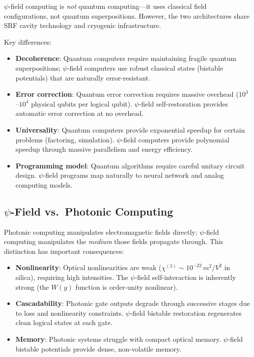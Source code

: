 \documentclass[12pt,a4paper,twoside]{article}
\begin{document}
$\psi$-field computing is \emph{not} quantum computing---it uses classical field configurations, not quantum superpositions. However, the two architectures share SRF cavity technology and cryogenic infrastructure.

Key differences:
\begin{itemize}
\item \textbf{Decoherence}: Quantum computers require maintaining fragile quantum superpositions; $\psi$-field computers use robust classical states (bistable potentials) that are naturally error-resistant.
\item \textbf{Error correction}: Quantum error correction requires massive overhead ($10^3$--$10^4$ physical qubits per logical qubit). $\psi$-field self-restoration provides automatic error correction at no overhead.
\item \textbf{Universality}: Quantum computers provide exponential speedup for certain problems (factoring, simulation). $\psi$-field computers provide polynomial speedup through massive parallelism and energy efficiency.
\item \textbf{Programming model}: Quantum algorithms require careful unitary circuit design. $\psi$-field programs map naturally to neural network and analog computing models.
\end{itemize}

\subsection{$\psi$-Field vs.\ Photonic Computing}\label{sec:vs_photonic}

Photonic computing manipulates electromagnetic fields directly; $\psi$-field computing manipulates the \emph{medium} those fields propagate through. This distinction has important consequences:

\begin{itemize}
\item \textbf{Nonlinearity}: Optical nonlinearities are weak ($\chi^{(3)} \sim 10^{-22}\,\si{m^2/V^2}$ in silica), requiring high intensities. The $\psi$-field self-interaction is inherently strong (the $W(y)$ function is order-unity nonlinear).
\item \textbf{Cascadability}: Photonic gate outputs degrade through successive stages due to loss and nonlinearity constraints. $\psi$-field bistable restoration regenerates clean logical states at each gate.
\item \textbf{Memory}: Photonic systems struggle with compact optical memory. $\psi$-field bistable potentials provide dense, non-volatile memory.
\end{itemize}
\end{document}

